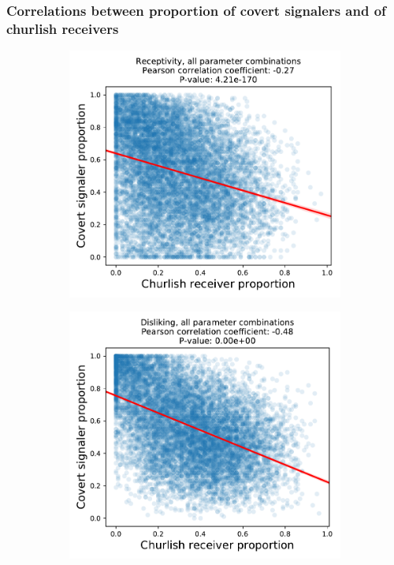 \documentclass[11pt,letterpaper]{article}
\begin{document}
\subsubsection{Correlations between proportion of covert signalers and of churlish receivers}

\begin{figure}[H]
  \centering
  \begin{subfigure}{0.49\textwidth}
    \centering
    \includegraphics[width=\textwidth]{prelim/Figures/receptivity_allcombos_reg.pdf}
    \caption{}
    \label{fig:}
  \end{subfigure}
  \begin{subfigure}{0.49\textwidth}
    \centering
    \includegraphics[width=\textwidth]{prelim/Figures/disliking_allcombos_reg.pdf}

\end{subfigure}
\end{figure}
\end{document}
